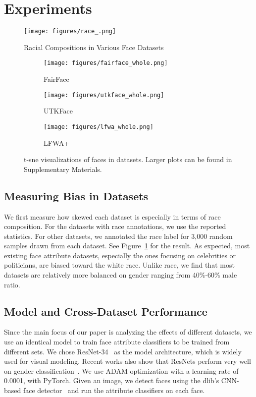 \section{Experiments}

\begin{figure}
    \centering
      \texttt{[image: figures/race\_.png]}
  \caption{Racial Compositions in Various Face Datasets}
\label{fig:race-comp}
\end{figure}



\begin{figure*}
    \centering
    \begin{subfigure}[t]{0.33\textwidth}
    \centering
      \texttt{[image: figures/fairface\_whole.png]}
      \caption{FairFace}
     \end{subfigure}
    \begin{subfigure}[t]{0.33\textwidth}  \centering
      \texttt{[image: figures/utkface\_whole.png]}
      \caption{UTKFace}
     \end{subfigure}
    \begin{subfigure}[t]{0.33\textwidth}  \centering
      \texttt{[image: figures/lfwa\_whole.png]}
      \caption{LFWA+}
     \end{subfigure}
  \caption{t-sne visualizations \cite{maaten2008visualizing} of faces in datasets. Larger plots can be found in Supplementary Materials. }
\label{fig:tsne}
\end{figure*}


\subsection{Measuring Bias in Datasets}
We first measure how skewed each dataset is especially in terms of race composition. 
For the datasets with race annotations, we use the reported statistics. For other datasets, we annotated the race label for 3,000 random samples drawn from each dataset. See Figure~\ref{fig:race-comp} for the result. As expected, most existing face attribute datasets, especially the ones focusing on celebrities or politicians, are biased toward the white race. 
Unlike race, we find that most datasets are relatively more balanced on gender ranging from 40\%-60\% male ratio. 


\subsection{Model and Cross-Dataset Performance}
Since the main focus of our paper is analyzing the effects of different datasets, we use an identical model to train face attribute classifiers to be trained from different sets. We chose ResNet-34~\cite{he2016deep} as the model architecture, which is widely used for visual modeling. Recent works also show that ResNets perform very well on gender classification~\cite{ranjan2019hyperface}. We use ADAM optimization \cite{kingma2014adam} with a learning rate of 0.0001, with PyTorch. 
Given an image, we detect faces using the dlib's CNN-based face detector~\cite{king2015max} and run the attribute classifiers on each face. 

